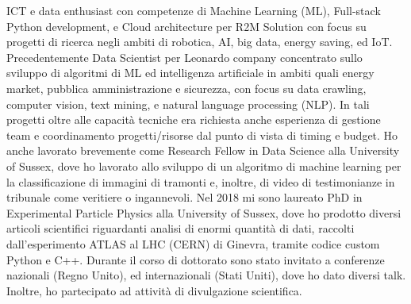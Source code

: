 	
ICT e data enthusiast con competenze di Machine Learning (ML), Full-stack Python development, e Cloud architecture per R2M Solution con focus su progetti di ricerca negli ambiti di robotica, AI, big data, energy saving, ed IoT. 
Precedentemente Data Scientist per Leonardo company concentrato sullo sviluppo di algoritmi di ML ed intelligenza artificiale in ambiti quali energy market, pubblica amministrazione e sicurezza, con focus su data crawling, computer vision, text mining, e natural language processing (NLP). In tali progetti oltre alle capacità tecniche era richiesta anche esperienza di gestione team e coordinamento progetti/risorse dal punto di vista di timing e budget. Ho anche lavorato brevemente come Research Fellow in Data Science alla University of Sussex, dove ho lavorato allo sviluppo di un algoritmo di machine learning per la classificazione di immagini di tramonti e, inoltre, di video di testimonianze in tribunale come veritiere o ingannevoli.
Nel 2018 mi sono laureato PhD in Experimental Particle Physics alla University of Sussex, dove ho prodotto diversi articoli scientifici riguardanti analisi di enormi quantità di dati, raccolti dall'esperimento ATLAS al LHC (CERN) di Ginevra, tramite codice custom Python e C++. Durante il corso di dottorato sono stato invitato a conferenze nazionali (Regno Unito), ed internazionali (Stati Uniti), dove ho dato diversi talk. Inoltre, ho partecipato ad attività di divulgazione scientifica.
